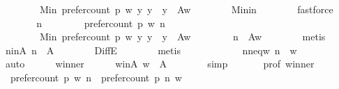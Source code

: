 \begin{isabellebody}
\ \ \ \ \ \ \ \ Min\ {\isacharbraceleft}{\kern0pt}prefer{\isacharunderscore}{\kern0pt}count\ p\ w\ y\ {\isacharbar}{\kern0pt}y\ {\isachardot}{\kern0pt}\ y\ {\isasymin}\ A{\isacharminus}{\kern0pt}{\isacharbraceleft}{\kern0pt}w{\isacharbraceright}{\kern0pt}{\isacharbraceright}{\kern0pt}{\isachardoublequoteclose}\isanewline
\ \ \ \ \ \ \isamarkupfalse%
\ Min{\isacharunderscore}{\kern0pt}in\isanewline
\ \ \ \ \ \ \isamarkupfalse%
\ fastforce\isanewline
\ \ \ \ \isamarkupfalse%
\ \isamarkupfalse%
\ n\ \ {}{}{}{\isacharcolon}{\kern0pt}\isanewline
\ \ \ \ \ \ {\isachardoublequoteopen}prefer{\isacharunderscore}{\kern0pt}count\ p\ w\ n\ {\isacharequal}{\kern0pt}\isanewline
\ \ \ \ \ \ \ \ Min\ {\isacharbraceleft}{\kern0pt}prefer{\isacharunderscore}{\kern0pt}count\ p\ w\ y\ {\isacharbar}{\kern0pt}y\ {\isachardot}{\kern0pt}\ y\ {\isasymin}\ A{\isacharminus}{\kern0pt}{\isacharbraceleft}{\kern0pt}w{\isacharbraceright}{\kern0pt}{\isacharbraceright}{\kern0pt}{\isachardoublequoteclose}\ \isanewline
\ \ \ \ \ \ {}{\isacharcolon}{\kern0pt}\ {\isachardoublequoteopen}n\ {\isasymin}\ A{\isacharminus}{\kern0pt}{\isacharbraceleft}{\kern0pt}w{\isacharbraceright}{\kern0pt}{\isachardoublequoteclose}\isanewline
\ \ \ \ \ \ \isamarkupfalse%
\ metis\isanewline
\ \ \ \ \isamarkupfalse%
\ n{\isacharunderscore}{\kern0pt}in{\isacharunderscore}{\kern0pt}A{\isacharcolon}{\kern0pt}\ {\isachardoublequoteopen}n\ {\isasymin}\ A{\isachardoublequoteclose}\isanewline
\ \ \ \ \ \ \isamarkupfalse%
\ DiffE\isanewline
\ \ \ \ \ \ \isamarkupfalse%
\ metis\isanewline
\ \ \ \ \isamarkupfalse%
\ {}\isanewline
\ \ \ \ \isamarkupfalse%
\ n{\isacharunderscore}{\kern0pt}neq{\isacharunderscore}{\kern0pt}w{\isacharcolon}{\kern0pt}\ {\isachardoublequoteopen}n\ {\isasymnoteq}\ w{\isachardoublequoteclose}\isanewline
\ \ \ \ \ \ \isamarkupfalse%
\ auto\isanewline
\ \ \ \ \isamarkupfalse%
\ winner\isanewline
\ \ \ \ \isamarkupfalse%
\ w{\isacharunderscore}{\kern0pt}in{\isacharunderscore}{\kern0pt}A{\isacharcolon}{\kern0pt}\ {\isachardoublequoteopen}w\ {\isasymin}\ A{\isachardoublequoteclose}\isanewline
\ \ \ \ \ \ \isamarkupfalse%
\ simp\isanewline
\ \ \ \ \isamarkupfalse%
\ {}\ prof\ winner\isanewline
\ \ \ \ \isamarkupfalse%
\ {}{}{}{\isacharcolon}{\kern0pt}\ {\isachardoublequoteopen}prefer{\isacharunderscore}{\kern0pt}count\ p\ w\ n\ {\isachargreater}{\kern0pt}\ prefer{\isacharunderscore}{\kern0pt}count\ p\ n\ w{\isachardoublequoteclose}\isanewline

\end{isabellebody}
